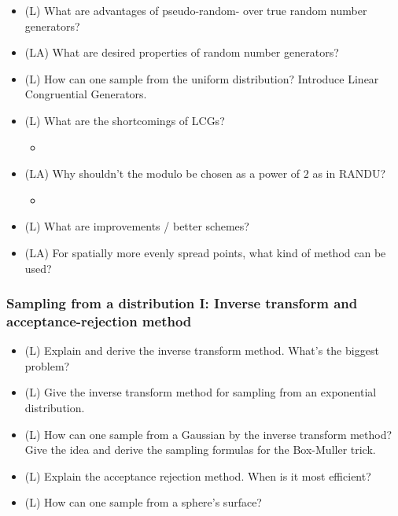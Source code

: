 \begin{itemize}
    \item (L) What are advantages of pseudo-random- over true random number generators?
    \answerboxS
    \item (LA) What are desired properties of random number generators?
    \answerboxM
    \item (L) How can one sample from the uniform distribution? Introduce Linear Congruential Generators.
    \answerboxM
    \item (L) What are the shortcomings of LCGs?
    \begin{itemize}
        \item {}
    \end{itemize}
    \answerboxM
    \item (LA) Why shouldn't the modulo be chosen as a power of $2$ as in RANDU?
    \begin{itemize}
        \item {}
    \end{itemize}
    \answerboxM
    \item (L) What are improvements / better schemes?
    \answerboxM
    \item (LA) For spatially more evenly spread points, what kind of method can be used?
    \answerboxM
\end{itemize}

\subsubsection*{Sampling from a distribution I: Inverse transform and acceptance-rejection method}
\begin{itemize}
    \item (L) Explain and derive the inverse transform method. What's the biggest problem?
    \answerboxL
    \item (L) Give the inverse transform method for sampling from an exponential distribution.
    \answerboxL
    \item (L) How can one sample from a Gaussian by the inverse transform method? Give the idea and derive the sampling formulas for the Box-Muller trick.
    \answerboxL
    \item (L) Explain the acceptance rejection method. When is it most efficient?
    \answerboxL
    \item (L) How can one sample from a sphere's surface?
    \answerboxM
\end{itemize}

